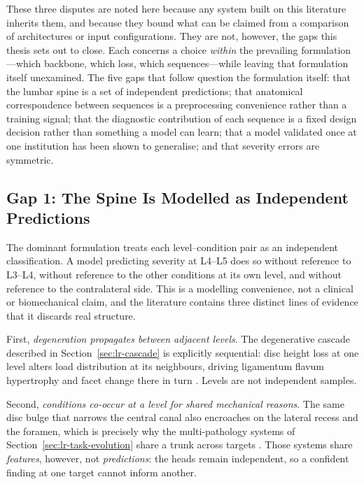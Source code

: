 These three disputes are noted here because any system built on this literature
inherits them, and because they bound what can be claimed from a comparison of
architectures or input configurations. They are not, however, the gaps this
thesis sets out to close. Each concerns a choice \emph{within} the prevailing
formulation---which backbone, which loss, which sequences---while leaving that
formulation itself unexamined. The five gaps that follow question the
formulation itself: that the lumbar spine is a set of independent
predictions; that anatomical correspondence between sequences is a
preprocessing convenience rather than a training signal; that the diagnostic
contribution of each sequence is a fixed design decision rather than
something a model can learn; that a model validated once at one institution
has been shown to generalise; and that severity errors are symmetric.

\subsection{Gap 1: The Spine Is Modelled as Independent Predictions}
\label{sec:lr-gap-relational}

The dominant formulation treats each level--condition pair as an independent
classification. A model predicting severity at L4--L5 does so without reference
to L3--L4, without reference to the other conditions at its own level, and
without reference to the contralateral side. This is a modelling convenience,
not a clinical or biomechanical claim, and the literature contains three
distinct lines of evidence that it discards real structure.

First, \emph{degeneration propagates between adjacent levels}. The degenerative
cascade described in Section~\ref{sec:lr-cascade} is explicitly sequential: disc
height loss at one level alters load distribution at its neighbours, driving
ligamentum flavum hypertrophy and facet change there in turn
\cite{bharadwaj2023deep,nikpasand2024automated}. Levels are not independent
samples.

Second, \emph{conditions co-occur at a level for shared mechanical reasons}. The
same disc bulge that narrows the central canal also encroaches on the lateral
recess and the foramen, which is precisely why the multi-pathology systems of
Section~\ref{sec:lr-task-evolution} share a trunk across targets
\cite{su2022automatic,lehnen2021detection}. Those systems share
\emph{features}, however, not \emph{predictions}: the heads remain independent,
so a confident finding at one target cannot inform another.

